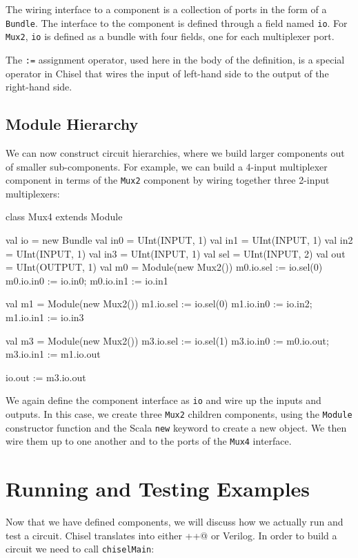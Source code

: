 \documentclass[twocolumn,10pt]{article}
\def\code#1{{\tt #1}}
\begin{document}
\noindent
The wiring interface to a component is a collection of ports in the
form of a \code{Bundle}.  The interface to the component is defined
through a field named \code{io}.  For \code{Mux2}, \code{io} is
defined as a bundle with four fields, one for each multiplexer port.

The \code{:=} assignment operator, used here in the body of the
definition, is a special operator in Chisel that wires the input of
left-hand side to the output of the right-hand side.

\subsection{Module Hierarchy}

We can now construct circuit hierarchies, where we build larger components out
of smaller sub-components.  For example, we can build a 4-input
multiplexer component in terms of the \code{Mux2} component by wiring
together three 2-input multiplexers:

\begin{scala}
class Mux4 extends Module {
  val io = new Bundle {
    val in0 = UInt(INPUT, 1)
    val in1 = UInt(INPUT, 1)
    val in2 = UInt(INPUT, 1)
    val in3 = UInt(INPUT, 1)
    val sel = UInt(INPUT, 2)
    val out = UInt(OUTPUT, 1)
  }
  val m0 = Module(new Mux2())
  m0.io.sel := io.sel(0) 
  m0.io.in0 := io.in0; m0.io.in1 := io.in1

  val m1 = Module(new Mux2())
  m1.io.sel := io.sel(0) 
  m1.io.in0 := io.in2; m1.io.in1 := io.in3

  val m3 = Module(new Mux2())
  m3.io.sel := io.sel(1) 
  m3.io.in0 := m0.io.out; m3.io.in1 := m1.io.out

  io.out := m3.io.out
}
\end{scala}

\noindent
We again define the component interface as \code{io} and wire up the
inputs and outputs.  In this case, we create three \code{Mux2}
children components, using the \code{Module} constructor function and 
the Scala \code{new} keyword to create a
new object.  We then wire them up to one another and to the ports of
the \code{Mux4} interface.

\section{Running and Testing Examples}

Now that we have defined components, we will discuss how we actually run and test a circuit.  Chisel translates into either \verb@C++@ or Verilog.   In order to build a circuit we need to call \code{chiselMain}:
\end{document}
